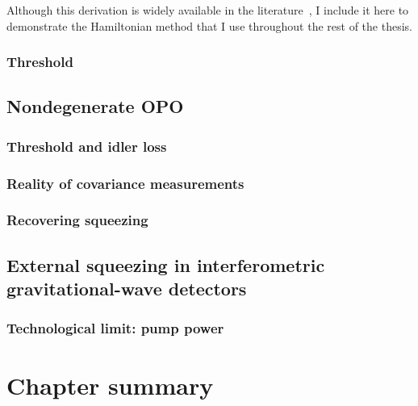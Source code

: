 Although this derivation is widely available in the literature~\cite{}, I include it here to demonstrate the Hamiltonian method that I use throughout the rest of the thesis. 



\subsubsection{Threshold}


\subsection{Nondegenerate OPO}

\subsubsection{Threshold and idler loss}

\subsubsection{Reality of covariance measurements}

\subsubsection{Recovering squeezing}

\subsection{External squeezing in interferometric gravitational-wave detectors}


\subsubsection{Technological limit: pump power} 

\section{Chapter summary}



